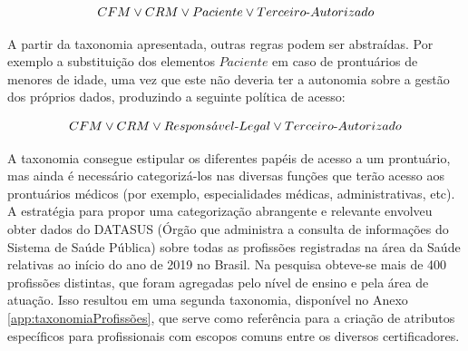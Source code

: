 \documentclass[a4paper,11pt]{article}
\begin{document}
\[ CFM \vee CRM \vee Paciente \vee Terceiro\textnormal{-}Autorizado \]




A partir da taxonomia apresentada, outras regras podem ser abstraídas.
Por exemplo a substituição dos elementos $Paciente$ em caso de prontuários de menores de idade, uma vez que este não deveria ter a autonomia sobre a gestão dos próprios dados, produzindo a seguinte política de acesso:

\[ CFM \vee CRM \vee Respons\acute{a}vel\textnormal{-}Legal \vee Terceiro\textnormal{-}Autorizado \]

A taxonomia consegue estipular os diferentes papéis de acesso a um prontuário, mas ainda é necessário categorizá-los nas diversas funções que terão acesso aos prontuários médicos (por exemplo, especialidades médicas, administrativas, etc).
A estratégia para propor uma categorização abrangente e relevante envolveu obter dados do DATASUS (Órgão que administra a consulta de informações do Sistema de Saúde Pública) sobre todas as profissões registradas na área da Saúde relativas ao início do ano de 2019 no Brasil.
Na pesquisa obteve-se mais de 400 profissões distintas, que foram agregadas pelo nível de ensino e pela área de atuação.
Isso resultou em uma segunda taxonomia, disponível no Anexo \ref{app:taxonomiaProfissões}, que serve como referência para a criação de atributos específicos para profissionais com escopos comuns entre os diversos certificadores. %
\end{document}
